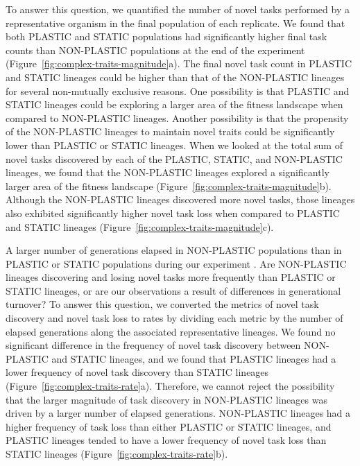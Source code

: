 To answer this question, we quantified the number of novel tasks performed by a representative organism in the final population of each replicate.
We found that both PLASTIC and STATIC populations had significantly higher final task counts than NON-PLASTIC populations at the end of the experiment (Figure~\ref{fig:complex-traits-magnitude}a). 
The final novel task count in PLASTIC and STATIC lineages could be higher than that of the NON-PLASTIC lineages for several non-mutually exclusive reasons. 
One possibility is that PLASTIC and STATIC lineages could be exploring a larger area of the fitness landscape when compared to NON-PLASTIC lineages. 
Another possibility is that the propensity of the NON-PLASTIC lineages to maintain novel traits could be significantly lower than PLASTIC or STATIC lineages. 
When we looked at the total sum of novel tasks discovered by each of the PLASTIC, STATIC, and NON-PLASTIC lineages, we found that the NON-PLASTIC lineages explored a significantly larger area of the fitness landscape (Figure~\ref{fig:complex-traits-magnitude}b).
Although the NON-PLASTIC lineages discovered more novel tasks, those lineages also exhibited significantly higher novel task loss when compared to PLASTIC and STATIC lineages (Figure~\ref{fig:complex-traits-magnitude}c). 



A larger number of generations elapsed in NON-PLASTIC populations than in PLASTIC or STATIC populations during our experiment \cite{supplemental_material}.
Are NON-PLASTIC lineages discovering and losing novel tasks more frequently than PLASTIC or STATIC lineages, or are our observations a result of differences in generational turnover?
To answer this question, we converted the metrics of novel task discovery and novel task loss to rates by dividing each metric by the number of elapsed generations along the associated representative lineages.
We found no significant difference in the frequency of novel task discovery between NON-PLASTIC and STATIC lineages, and we found that PLASTIC lineages had a lower frequency of novel task discovery than STATIC lineages (Figure~\ref{fig:complex-traits-rate}a).
Therefore, we cannot reject the possibility that the larger magnitude of task discovery in NON-PLASTIC lineages was driven by a larger number of elapsed generations.
NON-PLASTIC lineages had a higher frequency of task loss than either PLASTIC or STATIC lineages, and PLASTIC lineages tended to have a lower frequency of novel task loss than STATIC lineages (Figure~\ref{fig:complex-traits-rate}b). 



